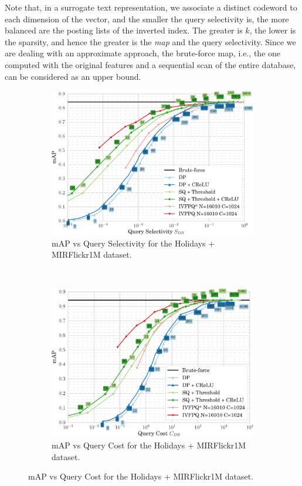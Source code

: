 Note that, in a surrogate text representation, we associate a distinct codeword to each dimension of the vector, and the smaller the query selectivity is, the more balanced are the posting lists of the inverted index.
The greater is $k$, the lower is the sparsity, and hence the greater is the \emph{\gls{map}} and the query selectivity.
Since we are dealing with an approximate approach, the brute-force \gls{map}, i.e., the one computed with the original features and a sequential scan of the entire database, can be considered as an upper bound.

\begin{figure}

\begin{subfigure}{\linewidth}
\centering
\caption{\centering mAP vs Query Selectivity for the Holidays + MIRFlickr1M dataset.}%
\includegraphics[width=\linewidth,height=0.44\textheight,keepaspectratio]{plot_Holidays_MIRFlickr1M_QSelectivity}
\end{subfigure}\\[4ex]
\begin{subfigure}{\linewidth}
\centering
\caption{\centering mAP vs Query Cost for the Holidays + MIRFlickr1M dataset.}%
\includegraphics[width=\linewidth,height=0.44\textheight,keepaspectratio]{plot_Holidays_MIRFlickr1M_QCost}
\end{subfigure}
\end{figure}%
